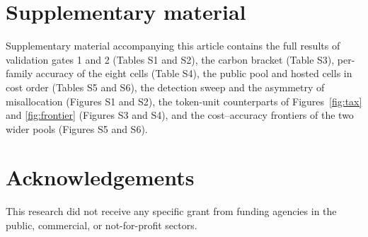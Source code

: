 \section*{Supplementary material}

Supplementary material accompanying this article contains the full results
of validation gates 1 and 2 (Tables S1 and S2), the carbon bracket
(Table S3), per-family accuracy of the eight cells (Table S4), the public
pool and hosted cells in cost order (Tables S5 and S6), the detection sweep and the asymmetry of misallocation (Figures S1
and S2), the token-unit counterparts of Figures~\ref{fig:tax} and
\ref{fig:frontier} (Figures S3 and S4), and the cost--accuracy frontiers of
the two wider pools (Figures S5 and S6).

\section*{Acknowledgements}

This research did not receive any specific grant from funding agencies in the
public, commercial, or not-for-profit sectors.

